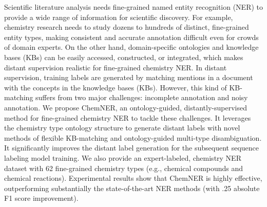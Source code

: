 Scientific literature analysis needs fine-grained named entity recognition (NER) to provide a wide range of information for scientific discovery. For example, chemistry research needs to study dozens to hundreds of distinct, fine-grained entity types, making consistent and accurate annotation difficult even for crowds of domain experts. On the other hand, domain-specific ontologies and knowledge bases (KBs) can be easily accessed, constructed, or integrated, which makes distant supervision realistic for fine-grained chemistry NER. In distant supervision, training labels are generated by matching mentions in a document with the concepts in the knowledge bases (KBs). However, this kind of KB-matching suffers from two major challenges: incomplete annotation and noisy annotation. We propose ChemNER, an ontology-guided, distantly-supervised method for fine-grained chemistry NER to tackle these challenges. It leverages the chemistry type ontology structure to generate distant labels with novel methods of flexible KB-matching and ontology-guided multi-type disambiguation. It significantly improves the distant label generation for the subsequent sequence labeling model training. We also provide an expert-labeled, chemistry NER dataset with 62 fine-grained chemistry types (e.g., chemical compounds and chemical reactions). Experimental results show that ChemNER is highly effective, outperforming substantially the state-of-the-art NER methods (with .25 absolute F1 score improvement).

